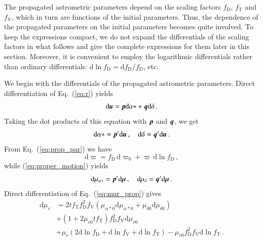 \documentclass{aa}
\def\vec#1{\ensuremath{\mathchoice{\mbox{\boldmath$\displaystyle#1$}}
{\mbox{\boldmath$\textstyle#1$}}
{\mbox{\boldmath$\scriptstyle#1$}}
{\mbox{\boldmath$\scriptscriptstyle#1$}}}}
\begin{document}

The propagated astrometric parameters depend on the scaling factors $f_\mathrm{D}$, $f_\mathrm{T}$ and $f_\mathrm{V}$, which in turn are functions of the initial parameters. Thus, the dependence of the propagated parameters on the initial parameters becomes quite involved. To keep the expressions compact, we do not expand the differentials of the scaling factors in what follows and give the complete expressions for them later in this section. Moreover, it is convenient to employ the logarithmic differentials rather than ordinary differentials: $\mathrm{d}\ln f_\mathrm{D}=\mathrm{d}f_\mathrm{D}/f_\mathrm{D}$, etc.

We begin with the differentials of the propagated astrometric parameters. Direct differentiation of Eq.~(\ref{eq:r}) yields
\begin{equation}\label{eq:du_dcoor}
  \mathrm{d}\vec{u}=\vec{p}\mathrm{d}{\alpha*}+\vec{q}\mathrm{d}\delta\,.
\end{equation}
Taking the dot products of this equation with $\vec{p}$ and $\vec{q}$, we get \begin{equation}\label{eq:dcoor_du}
  \mathrm{d}\alpha*=\vec{p}'\mathrm{d}\vec{u}\,,\quad
  \mathrm{d}\delta=\vec{q}'\mathrm{d}\vec{u}\,.
\end{equation}
From Eq.~(\ref{eq:prop_par}) we have
\begin{equation}
  \mathrm{d}\varpi=f_\mathrm{D}\,\mathrm{d}\varpi_0+\varpi\,\mathrm{d}\ln f_\mathrm{D}\,,
\end{equation}
while (\ref{eq:proper_motion}) yields
\begin{equation}\label{eq:dmu_du}
  \mathrm{d}\mu_{\alpha*}=\vec{p}'\mathrm{d}\vec{\mu}\,,\quad
  \mathrm{d}\mu_\delta=\vec{q}'\mathrm{d}\vec{\mu}\,.
\end{equation}
Direct differentiation of Eq.~(\ref{eq:mur_prop}) gives
\begin{equation}\label{eq:dmur}
 \begin{aligned}
    \mathrm{d}\mu_r
    &=
    2tf_\mathrm{T}f_\mathrm{D}^2f_\mathrm{V}
    \left(\mu_{\alpha*0}\mathrm{d}\mu_{\alpha*0}+\mu_{\delta0}\mathrm{d}\mu_{\delta0}\right)\\
    &+
    \left(1+2\mu_{r0}tf_\mathrm{T}\right)f_\mathrm{D}^2f_\mathrm{V}\mathrm{d}\mu_{r0}\\
    &+
    \mu_r
    \left(2\mathrm{d}\ln f_\mathrm{D}+\mathrm{d}\ln f_\mathrm{V}+\mathrm{d}\ln f_\mathrm{T}\right)
    -\mu_{r0}f_\mathrm{D}^2f_\mathrm{V}\mathrm{d}\ln f_\mathrm{T}\,.
 \end{aligned}
\end{equation}
\end{document}
